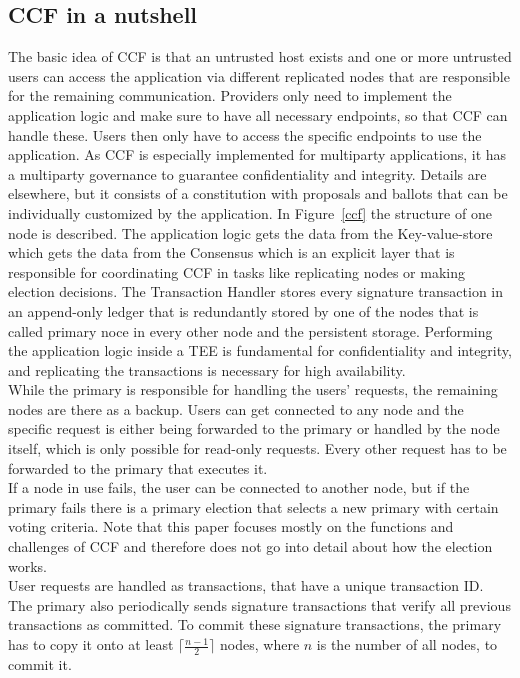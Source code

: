 \subsection{CCF in a nutshell}
The basic idea of CCF is that an untrusted host exists and one or more untrusted users can access the application via different replicated nodes that are responsible for the remaining communication. Providers only need to implement the application logic and make sure to have all necessary endpoints, so that CCF can handle these. Users then only have to access the specific endpoints to use the application. As CCF is especially implemented for multiparty applications, it has a multiparty governance to guarantee confidentiality and integrity. Details are elsewhere, but it consists of a constitution with proposals and ballots that can be individually customized by the application. In Figure~\ref{ccf} the structure of one node is described. The application logic gets the data from the Key-value-store which gets the data from the Consensus which is an explicit layer that is responsible for coordinating CCF in tasks like replicating nodes or making election decisions.
  The Transaction Handler stores every signature transaction in an append-only ledger that is redundantly stored by one of the nodes that is called primary noce in every other node and the persistent storage. Performing the application logic inside a TEE is fundamental for confidentiality and integrity, and replicating the transactions is necessary for high availability.\\ %
While the primary is responsible for handling the users' requests, the remaining nodes are there as a backup. Users can get connected to any node and the specific request is either being forwarded to the primary or handled by the node itself, which is only possible for read-only requests. Every other request has to be forwarded to the primary that executes it.\\
 If a node in use fails, the user can be connected to another node, but if the primary fails there is a primary election that selects a new primary with certain voting criteria. Note that this paper focuses mostly on the functions and challenges of CCF and therefore does not go into detail about how the election works. \\
 User requests are handled as transactions, that have a unique transaction ID. The primary also periodically sends signature transactions that verify all previous transactions as committed. To commit these signature transactions, the primary has to copy it onto at least $\lceil\frac{n-1}{2}\rceil$ nodes, where $n$ is the number of all nodes, to commit it.\\
